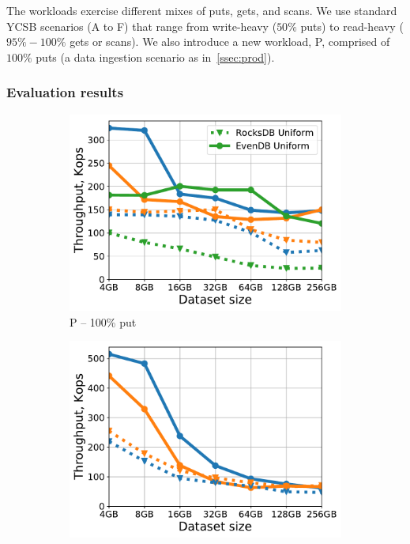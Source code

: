 The workloads exercise different mixes of puts, gets, and scans. We use standard YCSB scenarios 
(A to F) that range from write-heavy ($50\%$ puts) to read-heavy ($95\%-100\%$ gets or scans). 
We also introduce a new workload, P, comprised of $100\%$ puts (a data ingestion scenario
as in~\cref{ssec:prod}).

\subsubsection{Evaluation results}

\begin{figure}[tb]
\centering
\begin{subfigure}{0.32\linewidth}
\includegraphics[width=\textwidth]{figs/Workload_P_line.pdf}
\caption{P -- 100\% put}
\label{fig:throughput:p}
\end{subfigure}
\begin{subfigure}{0.32\linewidth}
\includegraphics[width=\textwidth]{figs/Workload_A_line.pdf}

\end{subfigure}
\end{figure}
